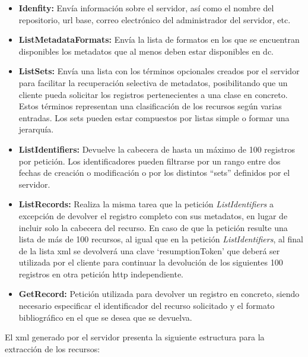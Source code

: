\begin{itemize}
	\item \textbf{Idenfity:} Envía información sobre el servidor, así como el nombre del repositorio, \acrshort{url} base, correo electrónico del administrador del servidor, etc.
	\item \textbf{ListMetadataFormats:} Envía la lista de formatos en los que se encuentran disponibles los metadatos que al menos deben estar disponibles en \acrshort{dc}.
	\item \textbf{ListSets:} Envía una lista con los términos opcionales creados por el servidor para facilitar la recuperación selectiva de metadatos, posibilitando que un cliente pueda solicitar los registros pertenecientes a una clase en concreto. Estos términos representan una clasificación de los recursos según varias entradas. Los sets pueden estar compuestos por listas simple o formar una jerarquía.
	\item \textbf{ListIdentifiers: } Devuelve la cabecera de hasta un máximo de 100 registros por petición. Los identificadores pueden filtrarse por un rango entre dos fechas de creación o modificación o por los distintos ``sets'' definidos por el servidor.
	\item \textbf{ListRecords: } Realiza la misma tarea que la petición \textit{ListIdentifiers} a excepción de devolver el registro completo con sus metadatos, en lugar de incluir solo la cabecera del recurso. En caso de que la petición resulte una lista de más de 100 recursos, al igual que en la petición \textit{ListIdentifiers}, al final de la lista \acrshort{xml} se devolverá una clave `resumptionToken' que deberá ser utilizada por el cliente para continuar la devolución de los siguientes 100 registros en otra petición \acrshort{http} independiente.
	\item \textbf{GetRecord: } Petición utilizada para devolver un registro en concreto, siendo necesario especificar el identificador del recurso solicitado y el formato bibliográfico en el que se desea que se devuelva.
\end{itemize}

El \acrshort{xml} generado por el servidor presenta la siguiente estructura para la extracción de los recursos:

